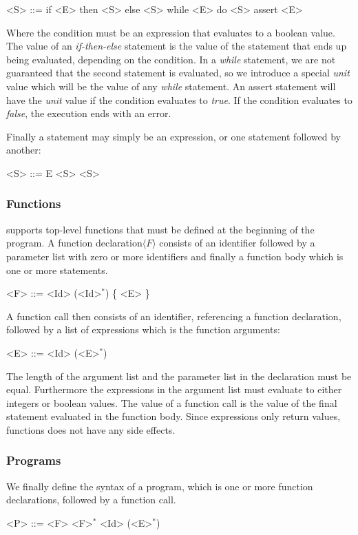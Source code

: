 \begin{grammar}
	<S> ::= if <E> then <S> else <S>
	\alt while <E> do <S>
	\alt assert <E>
\end{grammar}
Where the condition must be an expression that evaluates to a boolean value. 
The value of an \textsl{if-then-else} statement is the value of the statement that ends up being evaluated, depending on the condition. In a \textsl{while} statement, we are not guaranteed that the second statement is evaluated, so we introduce a special \textsl{unit} value which will be the value of any \textsl{while} statement. An assert statement will have the \textsl{unit} value if the condition evaluates to \textsl{true}. If the condition evaluates to \textsl{false}, the execution ends with an error.

\bigskip

Finally a statement may simply be an expression, or one statement followed by another:

\begin{grammar}
	<S> ::= E
	 <S>
\end{grammar}
 
 

\subsubsection{Functions}
\explanguage supports top-level functions that must be defined at the beginning of the program. A function declaration$\langle F \rangle$ consists of an identifier followed by a parameter list with zero or more identifiers and finally a function body which is one or more statements.

\begin{grammar}
	<F> ::= <Id> (<Id>$^{*}$) \{ <E> \}
\end{grammar}

A function call then consists of an identifier, referencing a function declaration, followed by a list of expressions which is the function arguments:

\begin{grammar}
	<E> ::= <Id> (<E>$^{*}$) 
\end{grammar}

The length of the argument list and the parameter list in the declaration must be equal. Furthermore the expressions in the argument list must evaluate to either integers or  boolean values.
The value of a function call is the value of the final statement evaluated in the function body. Since expressions only return values, functions does not have any side effects.


\subsubsection{Programs}
We finally define the syntax of a \explanguage program, which is one or more function declarations, followed by a function call. 

\begin{grammar}
	<P> ::= <F> <F>$^{*}$  <Id> (<E>$^{*}$) 
\end{grammar}









	